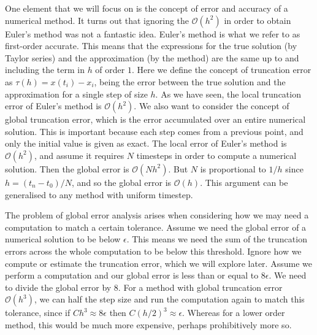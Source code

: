 One element that we will focus on is the concept of error and accuracy of a numerical method.
It turns out that ignoring the $\mathcal{O}(h^2)$ in order to obtain Euler's method was not a fantastic idea.
Euler's method is what we refer to as first-order accurate.
This means that the expressions for the true solution (by Taylor series) and the approximation (by the method) are the same up to and including the term in $h$ of order $1$.
Here we define the concept of truncation error as $\tau(h) = x(t_i) - x_i$, being the error between the true solution and the approximation for a single step of size $h$.
As we have seen, the local truncation error of Euler's method is $\mathcal{O}(h^2)$.
We also want to consider the concept of global truncation error, which is the error accumulated over an entire numerical solution.
This is important because each step comes from a previous point, and only the initial value is given as exact. %
The local error of Euler's method is $\mathcal{O}(h^2)$, and assume it requires $N$ timesteps in order to compute a numerical solution.
Then the global error is $\mathcal{O}(Nh^2)$. But $N$ is proportional to $1/h$ since $h = (t_n - t_0)/N$, and so the global error is $\mathcal{O}(h)$.
This argument can be generalised to any method with uniform timestep.

The problem of global error analysis arises when considering how we may need a computation to match a certain tolerance.
Assume we need the global error of a numerical solution to be below $\epsilon$.
This means we need the sum of the truncation errors across the whole computation to be below this threshold.
Ignore how we compute or estimate the truncation error, which we will explore later.
Assume we perform a computation and our global error is less than or equal to $8 \epsilon$.
We need to divide the global error by $8$. For a method with global truncation error $\mathcal{O}(h^3)$,
we can half the step size and run the computation again to match this tolerance, since if $C h^3 \approx 8 \epsilon$ then $C (h/2)^3 \approx \epsilon$.
Whereas for a lower order method, this would be much more expensive, perhaps prohibitively more so.

